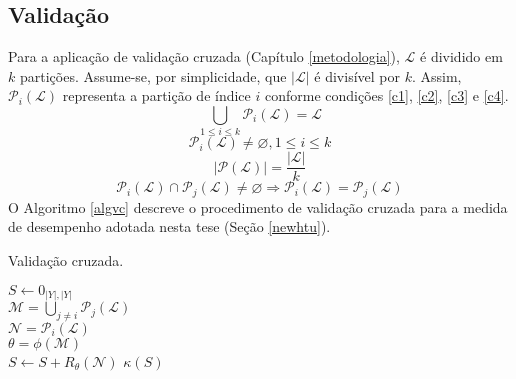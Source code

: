 \subsection{Validação}
Para a aplicação de validação cruzada (Capítulo \ref{metodologia}), $\mathcal{L}$ é dividido em $k$ partições.
Assume-se, por simplicidade, que $|\mathcal{L}|$ é divisível por $k$.
Assim, $\mathcal{P}_i(\mathcal{L})$ representa a partição de índice $i$ conforme condições \ref{c1}, \ref{c2}, \ref{c3} e \ref{c4}.
\begin{equation}\label{c1}
  \bigcup\limits_{1 \leq i \leq k} \mathcal{P}_i(\mathcal{L}) = \mathcal{L}
\end{equation}
\begin{equation}\label{c2}
  \mathcal{P}_i(\mathcal{L}) \neq \varnothing, 1 \leq i \leq k
\end{equation}
\begin{equation}\label{c3}
   |\mathcal{P}(\mathcal{L})| = \frac{|\mathcal{L}|}{k}
\end{equation}
\begin{equation}\label{c4}
  \mathcal{P}_i(\mathcal{L}) \cap \mathcal{P}_j(\mathcal{L}) \neq \varnothing \Rightarrow \mathcal{P}_i(\mathcal{L})=\mathcal{P}_j(\mathcal{L})
\end{equation}
O Algoritmo \ref{algvc} descreve o procedimento de validação cruzada para a medida de desempenho adotada nesta tese (Seção \ref{newhtu}).
\begin{algoritmo}
\caption{Validação cruzada.}
\label{algvc}
\small
{}
   {
  $S \leftarrow 0_{|Y|,|Y|}$  \\
   {
      $\mathcal{M}=\bigcup\limits_{j\neq i}\mathcal{P}_j(\mathcal{L})$ \\
      $\mathcal{N}=\mathcal{P}_i(\mathcal{L})$ \\
      $\theta = \phi(\mathcal{M})$ \\
      $S \leftarrow S + R_\theta(\mathcal{N})$
    }
    \Return $\kappa(S)$
  }
\end{algoritmo}

